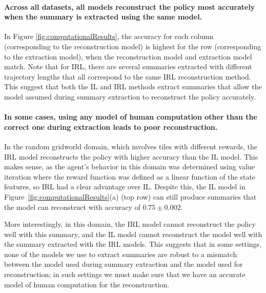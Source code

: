 \documentclass{article}
\begin{document}
\paragraph{Across all datasets, all models reconstruct the policy most accurately when the summary is extracted using the same model.} In Figure \ref{fig:computationalResults}, the accuracy for each column (corresponding to the reconstruction model) is highest for the row (corresponding to the extraction model), when the reconstruction model and extraction model match. Note that for IRL, there are several summaries extracted with different trajectory lengths that all correspond to the same IRL reconstruction method. This suggest that both the IL and IRL methods extract summaries that allow the model assumed during summary extraction to reconstruct the policy accurately. 

\paragraph{In some cases, using any model of human computation other than the correct one during extraction leads to poor reconstruction.}
In the random gridworld domain, which involves tiles with different rewards, the IRL model reconstructs the policy with higher accuracy than the IL model. This makes sense, as the agent's behavior in this domain was determined using value iteration where the reward function was defined as a linear function of the state features, so IRL had a clear advantage over IL. Despite this, the IL model in Figure~\ref{fig:computationalResults}(a) (top row) can still produce summaries that the model can reconstruct with accuracy of $0.75 \pm 0.002$.

More interestingly, in this domain, the IRL model cannot reconstruct the policy well with this summary, and the IL model cannot reconstruct the model well with the summary extracted with the IRL models. This suggests that in some settings, none of the models we use to extract summaries are robust to a mismatch between the model used during summary extraction and the model used for reconstruction; in such settings we must make sure that we have an accurate model of human computation for the reconstruction.
\end{document}
